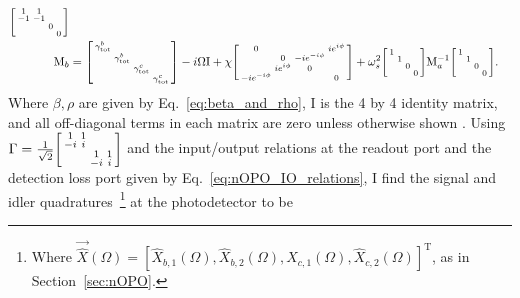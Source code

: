 \begin{align}
\begin{bsmallmatrix}
1 & 1 &  &  \\
-1 & -1 &  &  \\
 &  & 0 &  \\
 &  &  & 0
\end{bsmallmatrix}\\
\text{M}_b&=\begin{bsmallmatrix}
\gamma^b_\mathrm{tot} &  &  &  \\
 & \gamma^b_\mathrm{tot} &  &  \\
 &  & \gamma^c_\mathrm{tot} &  \\
 &  &  & \gamma^c_\mathrm{tot} 
\end{bsmallmatrix}-i\Omega \text{I}+\chi \begin{bsmallmatrix}
0 &  &  & i e^{i\phi} \\
 & 0 & -i e^{-i\phi} &  \\
 & i e^{i\phi} & 0 &  \\
-i e^{-i\phi} &  &  & 0
\end{bsmallmatrix}+\omega_s^2\begin{bsmallmatrix}
1 &  &  &  \\
 & 1 &  &  \\
 &  & 0 &  \\
 &  &  & 0
\end{bsmallmatrix}\text{M}_a^{-1}\begin{bsmallmatrix}
1 &  &  &  \\
 & 1 &  &  \\
 &  & 0 &  \\
 &  &  & 0
\end{bsmallmatrix}.
\end{align}
Where $\beta, \rho$ are given by Eq.~\ref{eq:beta_and_rho}, $\text{I}$ is the 4 by 4 identity matrix, and all off-diagonal terms in each matrix are zero unless otherwise shown . Using $\Gamma= \frac{1}{\sqrt2}\begin{bsmallmatrix}
1 & 1 &  &  \\
-i & i &  &  \\
 &  & 1 & 1 \\
 &  & -i & i
\end{bsmallmatrix}$ and the input/output relations at the readout port and the detection loss port given by Eq.~\ref{eq:nOPO_IO_relations}, I find the signal and idler quadratures~\footnote{Where $\vec{\hat X}(\Omega)=[\hat X_{b,1}(\Omega),\hat X_{b,2}(\Omega),\hat X_{c,1}(\Omega),\hat X_{c,2}(\Omega)]^\text{T}$, as in Section~\ref{sec:nOPO}.} at the photodetector to be
